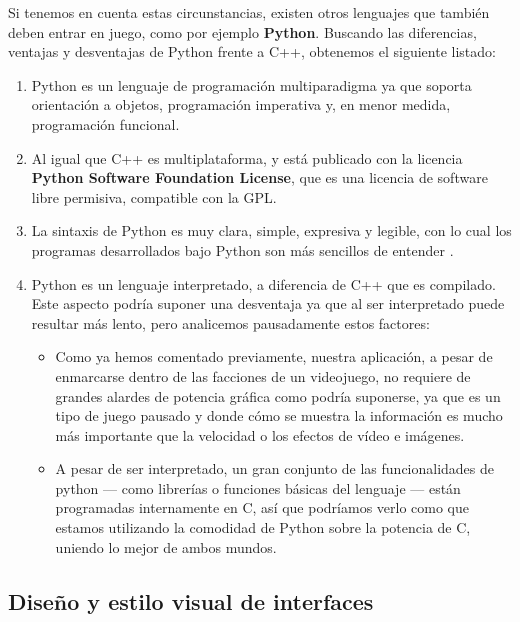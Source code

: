 Si tenemos en cuenta estas circunstancias, existen otros lenguajes que también deben entrar en juego,
como por ejemplo \textbf{Python}. Buscando las diferencias, ventajas y desventajas de Python frente a C++,
obtenemos el siguiente listado:

\begin{enumerate}
    \item Python es un lenguaje de programación multiparadigma ya que soporta orientación a objetos,
            programación imperativa y, en menor medida, programación funcional.
    \item Al igual que C++ es multiplataforma, y está publicado con la licencia \textbf{Python Software Foundation
            License}, que es una licencia de software libre permisiva, compatible con la GPL.
    \item La sintaxis de Python es muy clara, simple, expresiva y legible, con lo cual los programas
            desarrollados bajo Python son más sencillos de entender \cite{Pilgrim:2004:DP:983200}.
    \item Python es un lenguaje interpretado, a diferencia de C++ que es compilado. Este aspecto podría suponer una
            desventaja ya que al ser interpretado puede resultar más lento, pero analicemos pausadamente estos
            factores:
        \begin{itemize}
            \item Como ya hemos comentado previamente, nuestra aplicación, a pesar de enmarcarse dentro de las
                    facciones de un videojuego, no requiere de grandes alardes de potencia gráfica como podría
                    suponerse, ya que es un tipo de juego pausado y donde cómo se muestra la información
                    es mucho más importante que la velocidad o los efectos de vídeo e imágenes.
            \item A pesar de ser interpretado, un gran conjunto de las funcionalidades de python --- como librerías o
                    funciones básicas del lenguaje --- están programadas internamente en C, así que podríamos
                    verlo como que estamos utilizando la comodidad de Python sobre la potencia de C, uniendo
                    lo mejor de ambos mundos.
        \end{itemize}
\end{enumerate}


\subsection{Diseño y estilo visual de interfaces}

